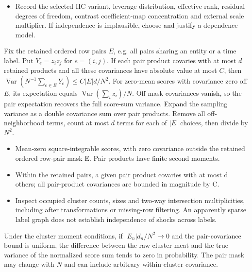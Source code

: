 \expandafter\def\csname statadic@diagnostics@STATADIC-HC-004\endcsname{\begin{itemize}
\item Record the selected HC variant, leverage distribution, effective rank, residual degrees of freedom, contrast coefficient-map concentration and external scale multiplier. If independence is implausible, choose and justify a dependence model.
\end{itemize}}
\expandafter\def\csname statadic@statement@STATADIC-CLUSTER-001\endcsname{Fix the retained ordered row pairs $E$, e.g. all pairs
  sharing an entity or a time label. Put $Y_e=z_i z_j$ for $e=(i,j)$.
  If each pair product covaries with at most $d$ retained products and all
  these covariances have absolute value at most $C$, then
  $\operatorname{Var}(N^{-1}\sum_{e\in E}Y_e)\le C|E|d/N^2$.
  For zero-mean scores with covariance zero off $E$, its expectation equals
  $\operatorname{Var}(\sum_i z_i)/N$.}
\expandafter\def\csname statadic@proof@STATADIC-CLUSTER-001\endcsname{Off-mask covariances vanish, so the pair expectation recovers
  the full score-sum variance. Expand the sampling variance as a double
  covariance sum over pair products. Remove all off-neighborhood terms,
  count at most $d$ terms for each of $|E|$ choices, then divide by $N^2$.}
\expandafter\def\csname statadic@assumptions@STATADIC-CLUSTER-001\endcsname{\begin{itemize}
\item Mean-zero square-integrable scores, with zero covariance outside the retained ordered row-pair mask E. Pair products have finite second moments.
\item Within the retained pairs, a given pair product covaries with at most d others; all pair-product covariances are bounded in magnitude by C.
\end{itemize}}
\expandafter\def\csname statadic@diagnostics@STATADIC-CLUSTER-001\endcsname{\begin{itemize}
\item Inspect occupied cluster counts, sizes and two-way intersection multiplicities, including after transformations or missing-row filtering. An apparently sparse label graph does not establish independence of shocks across labels.
\end{itemize}}
\expandafter\def\csname statadic@statement@STATADIC-CLUSTER-002\endcsname{Under the cluster moment conditions, if
  $|E_n|d_n/N^2\to0$ and the pair-covariance bound is uniform, the
  difference between the raw cluster meat and the true variance of the
  normalized score sum tends to zero in probability. The pair mask may
  change with $N$ and can include arbitrary within-cluster covariance.}

